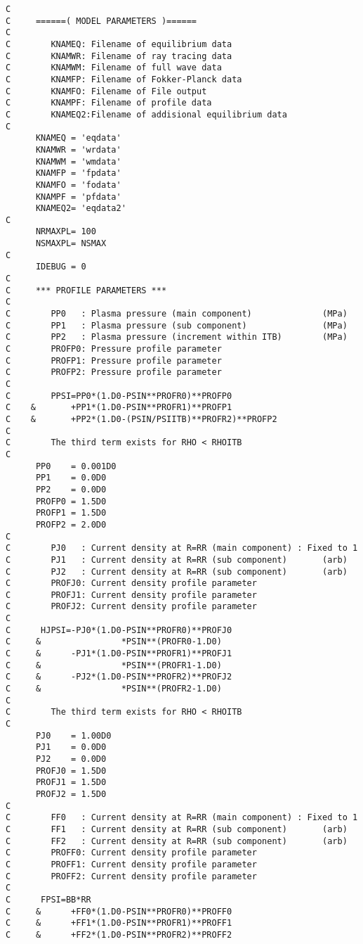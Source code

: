 \documentclass[11pt]{article}
\begin{document}
{\begin{verbatim}
C
C     ======( MODEL PARAMETERS )======
C
C        KNAMEQ: Filename of equilibrium data
C        KNAMWR: Filename of ray tracing data
C        KNAMWM: Filename of full wave data
C        KNAMFP: Filename of Fokker-Planck data
C        KNAMFO: Filename of File output
C        KNAMPF: Filename of profile data
C        KNAMEQ2:Filename of addisional equilibrium data
C
      KNAMEQ = 'eqdata'
      KNAMWR = 'wrdata'
      KNAMWM = 'wmdata'
      KNAMFP = 'fpdata'
      KNAMFO = 'fodata'
      KNAMPF = 'pfdata'
      KNAMEQ2= 'eqdata2'
C
      NRMAXPL= 100
      NSMAXPL= NSMAX
C
      IDEBUG = 0
C
C     *** PROFILE PARAMETERS ***
C
C        PP0   : Plasma pressure (main component)              (MPa)
C        PP1   : Plasma pressure (sub component)               (MPa)
C        PP2   : Plasma pressure (increment within ITB)        (MPa)
C        PROFP0: Pressure profile parameter
C        PROFP1: Pressure profile parameter
C        PROFP2: Pressure profile parameter
C
C        PPSI=PP0*(1.D0-PSIN**PROFR0)**PROFP0
C    &       +PP1*(1.D0-PSIN**PROFR1)**PROFP1
C    &       +PP2*(1.D0-(PSIN/PSIITB)**PROFR2)**PROFP2
C
C        The third term exists for RHO < RHOITB
C
      PP0    = 0.001D0
      PP1    = 0.0D0
      PP2    = 0.0D0
      PROFP0 = 1.5D0
      PROFP1 = 1.5D0
      PROFP2 = 2.0D0
C
C        PJ0   : Current density at R=RR (main component) : Fixed to 1
C        PJ1   : Current density at R=RR (sub component)       (arb)
C        PJ2   : Current density at R=RR (sub component)       (arb)
C        PROFJ0: Current density profile parameter
C        PROFJ1: Current density profile parameter
C        PROFJ2: Current density profile parameter
C
C      HJPSI=-PJ0*(1.D0-PSIN**PROFR0)**PROFJ0
C     &                *PSIN**(PROFR0-1.D0)
C     &      -PJ1*(1.D0-PSIN**PROFR1)**PROFJ1
C     &                *PSIN**(PROFR1-1.D0)
C     &      -PJ2*(1.D0-PSIN**PROFR2)**PROFJ2
C     &                *PSIN**(PROFR2-1.D0)
C
C        The third term exists for RHO < RHOITB
C
      PJ0    = 1.00D0
      PJ1    = 0.0D0
      PJ2    = 0.0D0
      PROFJ0 = 1.5D0
      PROFJ1 = 1.5D0
      PROFJ2 = 1.5D0
C
C        FF0   : Current density at R=RR (main component) : Fixed to 1
C        FF1   : Current density at R=RR (sub component)       (arb)
C        FF2   : Current density at R=RR (sub component)       (arb)
C        PROFF0: Current density profile parameter
C        PROFF1: Current density profile parameter
C        PROFF2: Current density profile parameter
C
C      FPSI=BB*RR
C     &      +FF0*(1.D0-PSIN**PROFR0)**PROFF0
C     &      +FF1*(1.D0-PSIN**PROFR1)**PROFF1
C     &      +FF2*(1.D0-PSIN**PROFR2)**PROFF2

\end{verbatim}}
\end{document}
